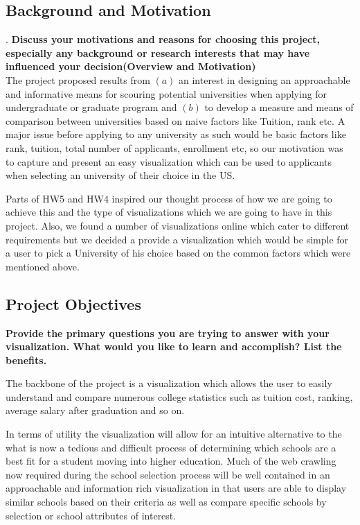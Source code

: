 \documentclass[11pt, a4paper]{article}
\begin{document}
\subsection{Background and Motivation}.\textbf{ Discuss your motivations and reasons for choosing this project, especially any background or research interests that may have influenced your decision(Overview and Motivation)}\\
The project proposed results from $(a)$ an interest in designing an approachable and informative means for scouring potential universities when applying for undergraduate or graduate program and $(b)$ to develop a measure and means of comparison between universities based on naive factors like Tuition, rank etc. A major issue before applying to any university as such would be basic factors like rank, tuition, total number of applicants, enrollment etc, so our motivation was to capture and present an easy visualization which can be used to applicants when selecting an university of their choice in the US. 

Parts of HW5 and HW4 inspired our thought process of how we are going to achieve this and the type of visualizations which we are going to have in this project. Also, we found a number of visualizations online which cater to different requirements but we decided a provide a visualization which would be simple for a user to pick a University of his choice based on the common factors which were mentioned above. 

\subsection{Project Objectives}\textbf{ Provide the primary questions you are trying to answer with your visualization. What would you like to learn and accomplish? List the benefits.}

The backbone of the project is a visualization which allows the user to easily understand and compare numerous college statistics such as tuition cost, ranking, average salary after graduation and so on.

In terms of utility the visualization will allow for an intuitive alternative to the what is now a tedious and difficult process of determining which schools are a best fit for a student moving into higher education. Much of the web crawling now required during the school selection process will be well contained in an approachable and information rich visualization in that users are able to display similar schools based on their criteria as well as compare specific schools by selection or school attributes of interest.
\end{document}
